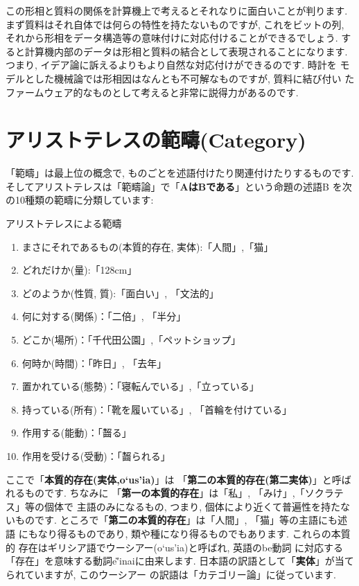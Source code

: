 この形相と質料の関係を計算機上で考えるとそれなりに面白いことが判ります.
 まず質料はそれ自体では何らの特性を持たないものですが, これをビットの列,
それから形相をデータ構造等の意味付けに対応付けることができるでしょう.
 すると計算機内部のデータは形相と質料の結合として表現されることになります.
 つまり, イデア論に訴えるよりもより自然な対応付けができるのです. 時計を
モデルとした機械論では形相因はなんとも不可解なものですが, 質料に結び付い
たファームウェア的なものとして考えると非常に説得力があるのです.


\section{アリストテレスの範疇(Category)}


「範疇」は最上位の概念で, ものごとを述語付けたり関連付けたりするものです.
そしてアリストテレスは「範疇論」で「\textbf{AはBである}」という命題の述語B
を次の10種類の範疇に分類しています:


\begin{itembox}[c]{{アリストテレスによる範疇}}
{\footnotesize
\begin{enumerate}
\item{まさにそれであるもの(本質的存在, 実体):「人間」,「猫」}
\item{どれだけか(量):「128cm」}
\item{どのようか(性質, 質):「面白い」, 「文法的」}
\item{何に対する(関係)：「二倍」, 「半分」}
\item{どこか(場所)：「千代田公園」,「ペットショップ」}
\item{何時か(時間)：「昨日」, 「去年」}
\item{置かれている(態勢)：「寝転んでいる」,「立っている」}
\item{持っている(所有)：「靴を履いている」, 「首輪を付けている」}
\item{作用する(能動)：「齧る」}
\item{作用を受ける(受動)：「齧られる」}
\end{enumerate}
}
\end{itembox}


ここで「\textbf{本質的存在(実体,\textgreek{o`us'ia})}」は
「\textbf{第二の本質的存在(第二実体)}」と呼ばれるものです. ちなみに
「\textbf{第一の本質的存在}」は「私」, 「みけ」,「ソクラテス」等の個体で
主語のみになるもの, つまり, 個体により近くて普遍性を持たないものです.
 ところで「\textbf{第二の本質的存在}」は「人間」, 「猫」等の主語にも述語
にもなり得るものであり, 類や種になり得るものでもあります. これらの本質的
存在はギリシア語でウーシアー(\textgreek{o`us'ia})と呼ばれ, 英語のbe動詞
に対応する「存在」を意味する動詞\textgreek{e\~{'i}nai}に由来します.
 日本語の訳語として「\textbf{実体}」が当てられていますが, このウーシアー
の訳語は「カテゴリー論」\cite{アリストテレス1}に従っています.
\newline


